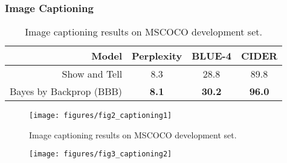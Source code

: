 \begin{frame}
  \frametitle{Image Captioning}
  \begin{table}[H]
    \caption{Image captioning results on MSCOCO development set.}
    \label{tab:captioning}
    \vskip 0.15in
    \centering
    \small
    \begin{tabular}{r|c|c|c}
      \textbf{Model}             & \textbf{Perplexity} & \textbf{BLUE-4} & \textbf{CIDER}\\ 
      \hline
      Show and Tell                &      8.3          &  28.8    & 89.8  \\
      Bayes by Backprop  (BBB)	 & 	    {\bf 8.1 }       & {\bf 30.2}	& {\bf 96.0}	\\
      \hline
    \end{tabular}
    \vskip -0.1in
  \end{table}
\end{frame}


\begin{frame}
  \begin{figure}[H]    
    \centering
    \texttt{[image: figures/fig2\_captioning1]}
    \caption{Image captioning results on MSCOCO development set. }
    \label{fig:caption}
  \end{figure}
\end{frame}


\begin{frame}
  \begin{figure}[H]
    \centering
    \texttt{[image: figures/fig3\_captioning2]}
    \label{fig:caption}
  \end{figure}
\end{frame}